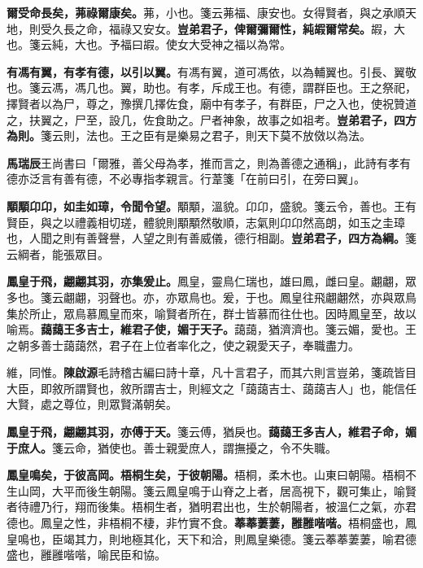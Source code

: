 \textbf{爾受命長矣，茀祿爾康矣。}{\footnotesize 茀，小也。箋云茀福、康安也。女得賢者，與之承順天地，則受久長之命，福祿又安女。}\textbf{豈弟君子，俾爾彌爾性，純嘏爾常矣。}{\footnotesize 嘏，大也。箋云純，大也。予福曰嘏。使女大受神之福以為常。}

\textbf{有馮有翼，有孝有德，以引以翼。}{\footnotesize 有馮有翼，道可馮依，以為輔翼也。引長、翼敬也。箋云馮，馮几也。翼，助也。有孝，斥成王也。有德，謂群臣也。王之祭祀，擇賢者以為尸，尊之，豫撰几擇佐食，廟中有孝子，有群臣，尸之入也，使祝贊道之，扶翼之，尸至，設几，佐食助之。尸者神象，故事之如祖考。}\textbf{豈弟君子，四方為則。}{\footnotesize 箋云則，法也。王之臣有是樂易之君子，則天下莫不放傚以為法。}

\begin{quoting}\textbf{馬瑞辰}王尚書曰「爾雅，善父母為孝，推而言之，則為善德之通稱」，此詩有孝有德亦泛言有善有德，不必專指孝親言。行葦箋「在前曰引，在旁曰翼」。\end{quoting}

\textbf{顒顒卬卬，如圭如璋，令聞令望。}{\footnotesize 顒顒，溫貌。卬卬，盛貌。箋云令，善也。王有賢臣，與之以禮義相切瑳，體貌則顒顒然敬順，志氣則卬卬然高朗，如玉之圭璋也，人聞之則有善聲譽，人望之則有善威儀，德行相副。}\textbf{豈弟君子，四方為綱。}{\footnotesize 箋云綱者，能張眾目。}

\textbf{鳳皇于飛，翽翽其羽，亦集爰止。}{\footnotesize 鳳皇，靈鳥仁瑞也，雄曰鳳，雌曰皇。翽翽，眾多也。箋云翽翽，羽聲也。亦，亦眾鳥也。爰，于也。鳳皇往飛翽翽然，亦與眾鳥集於所止，眾鳥慕鳳皇而來，喻賢者所在，群士皆慕而往仕也。因時鳳皇至，故以喻焉。}\textbf{藹藹王多吉士，維君子使，媚于天子。}{\footnotesize 藹藹，猶濟濟也。箋云媚，愛也。王之朝多善士藹藹然，君子在上位者率化之，使之親愛天子，奉職盡力。}

\begin{quoting}維，同惟。\textbf{陳啟源}毛詩稽古編曰詩十章，凡十言君子，而其六則言豈弟，箋疏皆目大臣，即敘所謂賢也，敘所謂吉士，則經文之「藹藹吉士、藹藹吉人」也，能信任大賢，處之尊位，則眾賢滿朝矣。\end{quoting}

\textbf{鳳皇于飛，翽翽其羽，亦傅于天。}{\footnotesize 箋云傅，猶戾也。}\textbf{藹藹王多吉人，維君子命，媚于庶人。}{\footnotesize 箋云命，猶使也。善士親愛庶人，謂撫擾之，令不失職。}

\textbf{鳳皇鳴矣，于彼高岡。梧桐生矣，于彼朝陽。}{\footnotesize 梧桐，柔木也。山東曰朝陽。梧桐不生山岡，大平而後生朝陽。箋云鳳皇鳴于山脊之上者，居高視下，觀可集止，喻賢者待禮乃行，翔而後集。梧桐生者，猶明君出也，生於朝陽者，被溫仁之氣，亦君德也。鳳皇之性，非梧桐不棲，非竹實不食。}\textbf{菶菶萋萋，雝雝喈喈。}{\footnotesize 梧桐盛也，鳳皇鳴也，臣竭其力，則地極其化，天下和洽，則鳳皇樂德。箋云菶菶萋萋，喻君德盛也，雝雝喈喈，喻民臣和協。}

